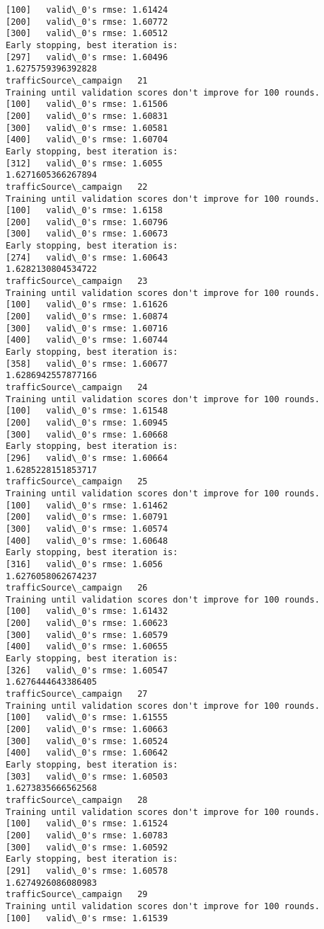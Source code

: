 \documentclass[11pt]{article}
\begin{document}
\begin{Verbatim}[commandchars=\\\{\}]
[100]	valid\_0's rmse: 1.61424
[200]	valid\_0's rmse: 1.60772
[300]	valid\_0's rmse: 1.60512
Early stopping, best iteration is:
[297]	valid\_0's rmse: 1.60496
1.6275759396392828
trafficSource\_campaign   21
Training until validation scores don't improve for 100 rounds.
[100]	valid\_0's rmse: 1.61506
[200]	valid\_0's rmse: 1.60831
[300]	valid\_0's rmse: 1.60581
[400]	valid\_0's rmse: 1.60704
Early stopping, best iteration is:
[312]	valid\_0's rmse: 1.6055
1.6271605366267894
trafficSource\_campaign   22
Training until validation scores don't improve for 100 rounds.
[100]	valid\_0's rmse: 1.6158
[200]	valid\_0's rmse: 1.60796
[300]	valid\_0's rmse: 1.60673
Early stopping, best iteration is:
[274]	valid\_0's rmse: 1.60643
1.6282130804534722
trafficSource\_campaign   23
Training until validation scores don't improve for 100 rounds.
[100]	valid\_0's rmse: 1.61626
[200]	valid\_0's rmse: 1.60874
[300]	valid\_0's rmse: 1.60716
[400]	valid\_0's rmse: 1.60744
Early stopping, best iteration is:
[358]	valid\_0's rmse: 1.60677
1.6286942557877166
trafficSource\_campaign   24
Training until validation scores don't improve for 100 rounds.
[100]	valid\_0's rmse: 1.61548
[200]	valid\_0's rmse: 1.60945
[300]	valid\_0's rmse: 1.60668
Early stopping, best iteration is:
[296]	valid\_0's rmse: 1.60664
1.6285228151853717
trafficSource\_campaign   25
Training until validation scores don't improve for 100 rounds.
[100]	valid\_0's rmse: 1.61462
[200]	valid\_0's rmse: 1.60791
[300]	valid\_0's rmse: 1.60574
[400]	valid\_0's rmse: 1.60648
Early stopping, best iteration is:
[316]	valid\_0's rmse: 1.6056
1.6276058062674237
trafficSource\_campaign   26
Training until validation scores don't improve for 100 rounds.
[100]	valid\_0's rmse: 1.61432
[200]	valid\_0's rmse: 1.60623
[300]	valid\_0's rmse: 1.60579
[400]	valid\_0's rmse: 1.60655
Early stopping, best iteration is:
[326]	valid\_0's rmse: 1.60547
1.6276444643386405
trafficSource\_campaign   27
Training until validation scores don't improve for 100 rounds.
[100]	valid\_0's rmse: 1.61555
[200]	valid\_0's rmse: 1.60663
[300]	valid\_0's rmse: 1.60524
[400]	valid\_0's rmse: 1.60642
Early stopping, best iteration is:
[303]	valid\_0's rmse: 1.60503
1.6273835666562568
trafficSource\_campaign   28
Training until validation scores don't improve for 100 rounds.
[100]	valid\_0's rmse: 1.61524
[200]	valid\_0's rmse: 1.60783
[300]	valid\_0's rmse: 1.60592
Early stopping, best iteration is:
[291]	valid\_0's rmse: 1.60578
1.6274926086080983
trafficSource\_campaign   29
Training until validation scores don't improve for 100 rounds.
[100]	valid\_0's rmse: 1.61539

\end{Verbatim}
\end{document}
